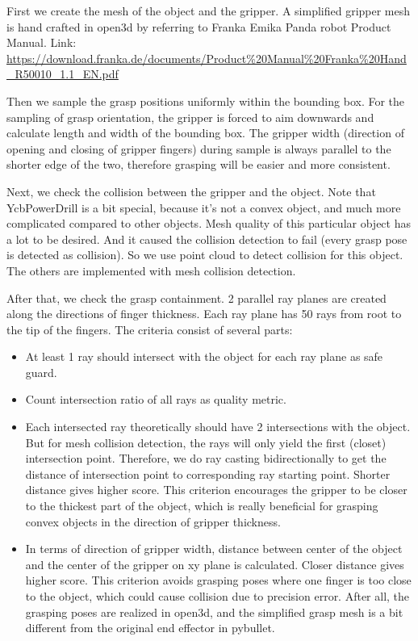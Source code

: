 \documentclass[
	english,
	accentcolor=11d,%
	type=intern,
	marginpar=false,
    logofile=media/PEARLTUDA.png
	]{tudapub}
\begin{document}
First we create the mesh of the object and the gripper. A simplified gripper mesh is hand crafted in open3d by referring to Franka Emika Panda robot Product Manual.
Link: \url{https://download.franka.de/documents/Product\%20Manual\%20Franka\%20Hand_R50010_1.1_EN.pdf}

Then we sample the grasp positions uniformly within the bounding box. For the sampling of grasp orientation, the gripper is forced to aim downwards and calculate length and width of the bounding box. The gripper width (direction of opening and closing of gripper fingers) during sample is always parallel to the shorter edge of the two, therefore grasping will be easier and more consistent.

Next, we check the collision between the gripper and the object. Note that YcbPowerDrill is a bit special, because it's not a convex object, and much more complicated compared to other objects. Mesh quality of this particular object has a lot to be desired. And it caused the collision detection to fail (every grasp pose is detected as collision). So we use point cloud to detect collision for this object. The others are implemented with mesh collision detection.

After that, we check the grasp containment. 2 parallel ray planes are created along the directions of finger thickness. Each ray plane has 50 rays from root to the tip of the fingers. The criteria consist of several parts:

\begin{itemize}
\item At least 1 ray should intersect with the object for each ray plane as safe guard.
\item Count intersection ratio of all rays as quality metric.
\item Each intersected ray theoretically should have 2 intersections with the object. But for mesh collision detection, the rays will only yield the first (closet) intersection point. Therefore, we do ray casting bidirectionally to get the distance of intersection point to corresponding ray starting point. Shorter distance gives higher score. This criterion encourages the gripper to be closer to the thickest part of the object, which is really beneficial for grasping convex objects in the direction of gripper thickness.
\item In terms of direction of gripper width, distance between center of the object and the center of the gripper on xy plane is calculated. Closer distance gives higher score. This criterion avoids grasping poses where one finger is too close to the object, which could cause collision due to precision error. After all, the grasping poses are realized in open3d, and the simplified grasp mesh is a bit different from the original end effector in pybullet.
\end{itemize}
\end{document}
